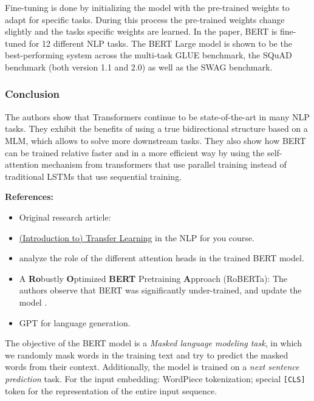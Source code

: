 \documentclass[11pt, a4paper]{amsart}
\begin{document}
Fine-tuning is done by initializing the model with the pre-trained weights to adapt for specific tasks. 
During this process the pre-trained weights change slightly and the tasks specific weights are learned.
In the paper, BERT is fine-tuned for 12 different NLP tasks.
The BERT Large model is shown to be the best-performing system across the multi-task GLUE benchmark, the SQuAD benchmark (both version 1.1 and 2.0) as well as the SWAG benchmark.

\subsubsection{Conclusion}

The authors show that Transformers continue to be state-of-the-art in many NLP tasks. 
They exhibit the benefits of using a true bidirectional structure based on a MLM, which allows to solve more downstream tasks. 
They also show how BERT can be trained relative faster and in a more efficient way by using the self-attention mechanism from transformers that use parallel training instead of traditional LSTMs that use sequential training.

\noindent \textbf{References:}
\begin{itemize}
	\item Original research article:  \cite{DBLP:journals/corr/abs-1810-04805}
	\item \href{https://lena-voita.github.io/nlp_course/transfer_learning.html}{(Introduction to) Transfer Learning} in the NLP for you course.
	\item \cite{clark-etal-2019-bert} analyze the role of the different attention heads in the trained BERT model.
	\item A \textbf{Ro}bustly \textbf{O}ptimized \textbf{BERT} Pretraining \textbf{A}pproach (RoBERTa):
	The authors observe that BERT was significantly under-trained, and update the model \cite{DBLP:journals/corr/abs-1907-11692}.
	\item GPT for language generation.
\end{itemize}

{
	\color{blue}
	
	The objective of the BERT model is a \emph{Masked language modeling task}, in which we randomly mask words in the training text and try to predict the masked words from their context.
	Additionally, the model is trained on a \emph{next sentence prediction} task.
	For the input embedding: WordPiece tokenization;
	special \texttt{[CLS]} token for the representation of the entire input sequence.
} %
\end{document}
